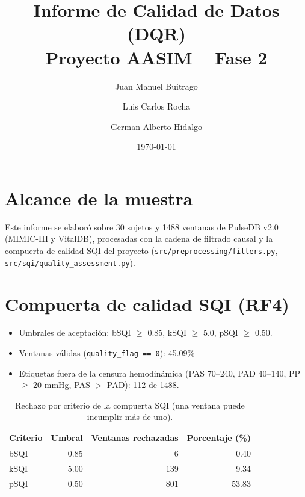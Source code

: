 \documentclass[11pt]{article}
\title{Informe de Calidad de Datos (DQR) \\ \large Proyecto AASIM -- Fase 2}
\author{Juan Manuel Buitrago \and Luis Carlos Rocha \and German Alberto Hidalgo}
\date{\today}
\begin{document}
\maketitle

\section*{Alcance de la muestra}
Este informe se elaboró sobre 30 sujetos y 1488 ventanas de PulseDB v2.0 (MIMIC-III y VitalDB), procesadas con la cadena de filtrado causal y la compuerta de calidad SQI del proyecto (\texttt{src/preprocessing/filters.py}, \texttt{src/sqi/quality\_assessment.py}).

\section{Compuerta de calidad SQI (RF4)}
\begin{itemize}
  \item Umbrales de aceptación: bSQI $\geq$ 0.85, kSQI $\geq$ 5.0, pSQI $\geq$ 0.50.
  \item Ventanas válidas (\texttt{quality\_flag == 0}): 45.09\%
  \item Etiquetas fuera de la censura hemodinámica (PAS 70--240, PAD 40--140, PP $\geq$ 20 mmHg, PAS $>$ PAD): 112 de 1488.
\end{itemize}

\begin{table}[H]
\centering
\begin{tabular}{lrrr}
\toprule
Criterio & Umbral & Ventanas rechazadas & Porcentaje (\%) \\
\midrule
bSQI & 0.85 & 6 & 0.40 \\
kSQI & 5.00 & 139 & 9.34 \\
pSQI & 0.50 & 801 & 53.83 \\
\bottomrule
\end{tabular}
\caption{Rechazo por criterio de la compuerta SQI (una ventana puede incumplir más de uno).}
\end{table}
\end{document}
